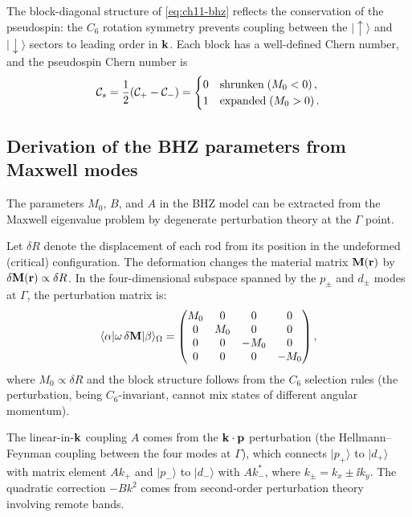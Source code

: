 The block-diagonal structure of \eqref{eq:ch11-bhz} reflects the
conservation of the pseudospin: the $C_6$ rotation symmetry prevents
coupling between the $|\uparrow\rangle$ and $|\downarrow\rangle$
sectors to leading order in $\mathbf{k}$.  Each block has a well-defined
Chern number, and the pseudospin Chern number is
\begin{equation}\label{eq:ch11-spin-chern-wuhu}
  \mathcal{C}_s = \frac{1}{2}(\mathcal{C}_+ - \mathcal{C}_-)
  = \begin{cases}
    0 & \text{shrunken} \; (M_0<0)\,,\\
    1 & \text{expanded} \; (M_0>0)\,.
  \end{cases}
\end{equation}

\subsection{Derivation of the BHZ parameters from Maxwell modes}
\label{sec:ch11-bhz-derivation}

The parameters $M_0$, $B$, and $A$ in the BHZ model can be extracted
from the Maxwell eigenvalue problem by degenerate perturbation theory
at the $\Gamma$ point.

Let $\delta R$ denote the displacement of each rod from its position
in the undeformed (critical) configuration.  The deformation changes
the material matrix $\mathbf{M}(\mathbf{r})$ by $\delta\mathbf{M}(\mathbf{r})\propto\delta R$.
In the four-dimensional subspace spanned by the $p_\pm$ and $d_\pm$
modes at $\Gamma$, the perturbation matrix is:
\begin{equation}\label{eq:ch11-perturbation}
  \langle\alpha|\omega\,\delta\mathbf{M}|\beta\rangle_{\Omega}
  = \begin{pmatrix}
    M_0 & 0 & 0 & 0 \\
    0 & M_0 & 0 & 0 \\
    0 & 0 & -M_0 & 0 \\
    0 & 0 & 0 & -M_0
  \end{pmatrix},
\end{equation}
where $M_0\propto\delta R$ and the block structure follows from the
$C_6$ selection rules (the perturbation, being $C_6$-invariant, cannot
mix states of different angular momentum).

The linear-in-$\mathbf{k}$ coupling $A$ comes from the $\mathbf{k}\cdot\mathbf{p}$
perturbation (the Hellmann--Feynman coupling between the four modes at
$\Gamma$), which connects $|p_+\rangle$ to $|d_+\rangle$ with matrix
element $Ak_+$ and $|p_-\rangle$ to $|d_-\rangle$ with $Ak_-^*$,
where $k_\pm=k_x\pm\ii k_y$.  The quadratic correction $-Bk^2$ comes
from second-order perturbation theory involving remote bands.

